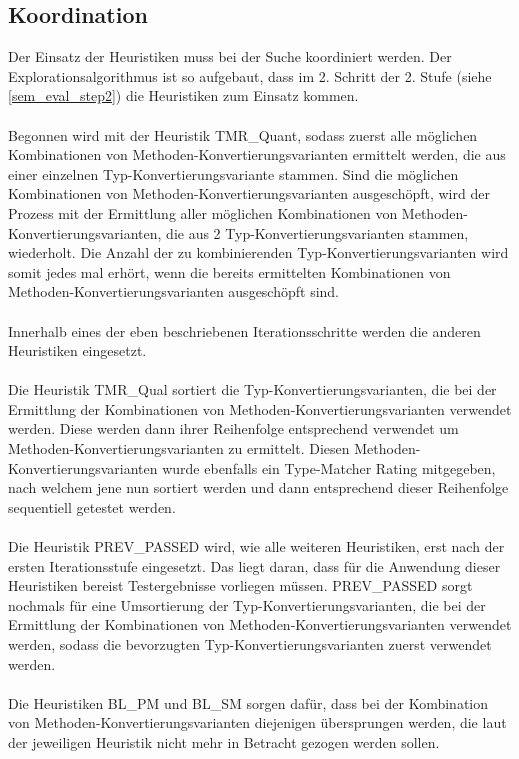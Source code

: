 \subsection{Koordination}
Der Einsatz der Heuristiken muss bei der Suche koordiniert werden. Der Explorationsalgorithmus ist so aufgebaut, dass im 2. Schritt der 2. Stufe (siehe \ref{sem_eval_step2}) die Heuristiken zum Einsatz kommen.\\\\
Begonnen wird mit der Heuristik TMR\_Quant, sodass zuerst alle möglichen Kombinationen von Methoden-Konvertierungsvarianten ermittelt werden, die aus einer einzelnen Typ-Konvertierungsvariante stammen. Sind die möglichen Kombinationen von Methoden-Konvertierungsvarianten ausgeschöpft, wird der Prozess mit der Ermittlung aller möglichen Kombinationen von Methoden-Konvertierungsvarianten, die aus 2 Typ-Konvertierungsvarianten stammen, wiederholt. Die Anzahl der zu kombinierenden Typ-Konvertierungsvarianten wird somit jedes mal erhört, wenn die bereits ermittelten Kombinationen von Methoden-Konvertierungsvarianten ausgeschöpft sind.\\\\
Innerhalb eines der eben beschriebenen Iterationsschritte werden die anderen Heuristiken eingesetzt.\\\\
Die Heuristik TMR\_Qual sortiert die Typ-Konvertierungsvarianten, die bei der Ermittlung der Kombinationen von Methoden-Konvertierungsvarianten verwendet werden. Diese werden dann ihrer Reihenfolge entsprechend verwendet um Methoden-Konvertierungsvarianten zu ermittelt. Diesen Methoden-Konvertierungsvarianten wurde ebenfalls ein Type-Matcher Rating mitgegeben, nach welchem jene nun sortiert werden und dann entsprechend dieser Reihenfolge sequentiell getestet werden.\\\\
Die Heuristik PREV\_PASSED wird, wie alle weiteren Heuristiken, erst nach der ersten Iterationsstufe eingesetzt. Das liegt daran, dass für die Anwendung dieser Heuristiken bereist Testergebnisse vorliegen müssen. PREV\_PASSED sorgt nochmals für eine Umsortierung der Typ-Konvertierungsvarianten, die bei der Ermittlung der Kombinationen von Methoden-Konvertierungsvarianten verwendet werden, sodass die bevorzugten Typ-Konvertierungsvarianten zuerst verwendet werden.\\\\
Die Heuristiken BL\_PM und BL\_SM sorgen dafür, dass bei der Kombination von Methoden-Konvertierungsvarianten diejenigen übersprungen werden, die laut der jeweiligen Heuristik nicht mehr in Betracht gezogen werden sollen.
